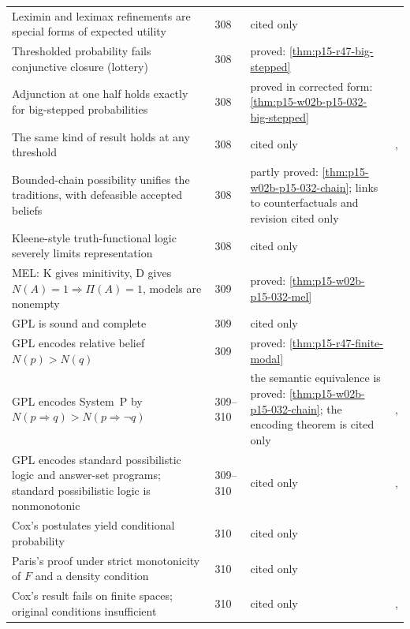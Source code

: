 \begin{longtable}{@{}p{.36\linewidth}p{.07\linewidth}p{.27\linewidth}p{.22\linewidth}@{}}
Leximin and leximax refinements are special forms of expected utility &
308 & cited only & \cite{R47FargierSabbadin2005} \\
Thresholded probability fails conjunctive closure (lottery) & 308 &
proved: \cref{thm:p15-r47-big-stepped} & \cite{R47Kyburg1961} \\
Adjunction at one half holds exactly for big-stepped probabilities & 308 &
proved in corrected form: \cref{thm:p15-w02b-p15-032-big-stepped} &
\cite{R47BenferhatDuboisPrade1999} \\
The same kind of result holds at any threshold & 308 & cited only &
\cite{R47BenferhatDuboisPrade1999}, \cite{R47Snow1999} \\
Bounded-chain possibility unifies the traditions, with defeasible accepted
beliefs & 308 & partly proved: \cref{thm:p15-w02b-p15-032-chain};
links to counterfactuals and revision cited only &
\cite{R47DuboisFargierPrade2004} \\
Kleene-style truth-functional logic severely limits representation & 308 &
cited only & \cite{R47CiucciDubois2013} \\
MEL: K gives minitivity, D gives \(N(A)=1\Rightarrow\Pi(A)=1\), models are
nonempty & 309 & proved: \cref{thm:p15-w02b-p15-032-mel} &
\cite{R47BanerjeeDubois2014} \\
GPL is sound and complete & 309 & cited only & \cite{R47DuboisPradeSchockaert2017} \\
GPL encodes relative belief \(N(p)>N(q)\) & 309 & proved:
\cref{thm:p15-r47-finite-modal} & \cite{R47DuboisPradeSchockaert2017} \\
GPL encodes System~P by \(N(p\Rightarrow q)>N(p\Rightarrow\neg q)\) & 309--310 &
the semantic equivalence is proved: \cref{thm:p15-w02b-p15-032-chain}; the
encoding theorem is cited only & \cite{R47DuboisPradeSchockaert2017},
\cite{KrausLehmannMagidor1990} \\
GPL encodes standard possibilistic logic and answer-set programs; standard
possibilistic logic is nonmonotonic & 309--310 & cited only &
\cite{R47DuboisLangPrade1994}, \cite{R47BenferhatDuboisPrade1998} \\
Cox's postulates yield conditional probability & 310 & cited only &
\cite{R47Cox1946} \\
Paris's proof under strict monotonicity of \(F\) and a density condition &
310 & cited only & \cite{R47Paris1994} \\
Cox's result fails on finite spaces; original conditions insufficient &
310 & cited only & \cite{R47Halpern1999a}, \cite{R47Halpern1999b} \\

\end{longtable}
